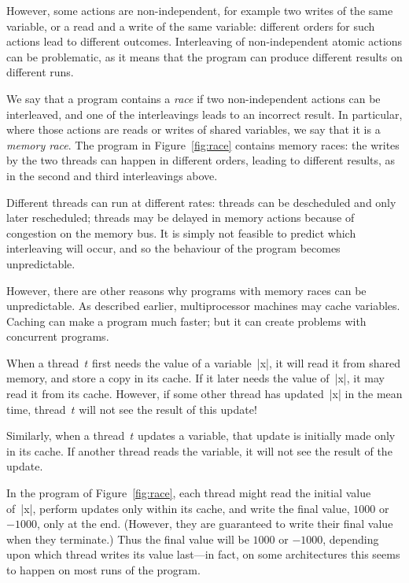 However, some actions are non-independent, for example two writes of the same
variable, or a read and a write of the same variable: different orders for
such actions lead to different outcomes.  Interleaving of non-independent
atomic actions can be problematic, as it means that the program can produce
different results on different runs.

We say that a program contains a \emph{race} if two
non-independent actions can be interleaved, and one of the interleavings leads
to an incorrect result.  In particular, where those actions are reads or
writes of shared variables, we say that it is a \emph{memory
  race}.  The
program in Figure~\ref{fig:race} contains memory races: the writes by the two
threads can happen in different orders, leading to different results, as in
the second and third interleavings above.

Different threads can run at different rates: threads can be descheduled and
only later rescheduled; threads may be delayed in memory actions because of
congestion on the memory bus.  It is simply not feasible to predict which
interleaving will occur, and so the behaviour of the program becomes
unpredictable. 


However, there are other reasons why programs with memory races can be
unpredictable.  
%
As described earlier, multiprocessor machines may cache variables.  Caching can make a program much faster; but it can create problems
with concurrent programs.

When a thread~$t$ first needs the value of a variable~|x|, it will read it
from shared memory, and store a copy in its cache.  If it later needs the
value of~|x|, it may read it from its cache.  However, if some other thread
has updated~|x| in the mean time, thread~$t$ will not see the result of this
update!

Similarly, when a thread~$t$ updates a variable, that update is initially made
only in its cache.  If another thread reads the variable, it will not see the
result of the update.

In the program of Figure~\ref{fig:race}, each thread might read the initial
value of~|x|, perform updates only within its cache, and write the final
value, $1000$ or $-1000$, only at the end.  (However, they are guaranteed to
write their final value when they terminate.)  Thus the final value will be
$1000$ or $-1000$, depending upon which thread writes its value last---in
fact, on some architectures this seems to happen on most runs of the program.

